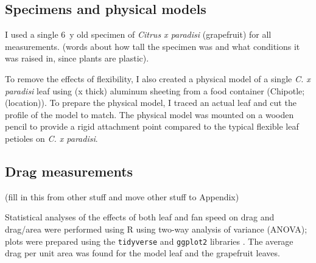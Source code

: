 \subsection{Specimens and physical models}
I used a single \SI{6}{y} old specimen of \emph{Citrus x paradisi} (grapefruit) for all measurements. (words about how tall the specimen was and what conditions it was raised in, since plants are plastic). 

To remove the effects of flexibility, I also created a physical model of a single \emph{C. x paradisi} leaf using (x thick) aluminum sheeting from a food container (Chipotle; (location)). To prepare the physical model, I traced an actual leaf and cut the profile of the model to match. The physical model was mounted on a wooden pencil to provide a rigid attachment point compared to the typical flexible leaf petioles on \emph{C. x paradisi}. 

\subsection{Drag measurements}
(fill in this from other stuff and move other stuff to Appendix)


Statistical analyses of the effects of both leaf and fan speed on drag and drag/area were performed using R \citep{r2020} using two-way analysis of variance (ANOVA); plots were prepared using the \lstinline{tidyverse} and \lstinline{ggplot2} libraries \citep{wickham2019tidyverse}. The average drag per unit area was found for the model leaf and the grapefruit leaves.

